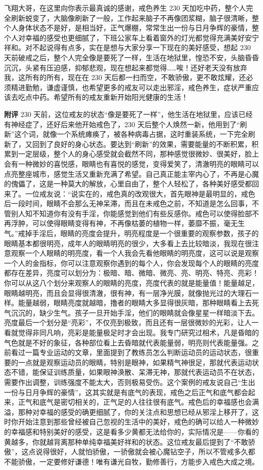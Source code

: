 \begin{case}
    飞翔大哥，在这里向你表示最真诚的感谢，戒色养生 230 天加吃中药，整个人完全刷新蜕变了，大脑像刷新了一般，工作起来脑子不再像团浆糊，脑子很清晰，整个人身体状态不是好，是相当好，正气爆棚，常常生出一份与日月争辉的豪情，整个人对幸福的感受也更细腻了，下班公家车上看着窗外的灯光都觉得充满美好安宁祥和。对不起说得有点多，实在是想与大家分享一下现在的美好感受，想起 230 天前破戒之后，整个人完全像是要死了一样，生活在地狱里，惶恐不安，头脑昏昏沉沉，头紧有压迫感，抑郁悲观，现在想起来都觉得……唉！还好老天没有放弃我，这所有的所有，现在在 230 天后都一扫而空，不敢骄傲，更不敢炫耀，还必须精进勤勉，谦虚谨慎，也希望更多的戒友可以走出邪淫，戒色养生，症状严重应该去吃点中药。希望所有的戒友重新开始阳光健康的生活！

    \textbf{附评} 230 天前，这位戒友的状态“像是要死了一样”，他生活在地狱里，应该已经有神经症了，还好后来他开始戒色了，230 天后整个人焕然一新，他用到了“刷新”这个词，就像一个系统瘫痪了，被各种病毒占据，这时重装系统，一下完全刷新了，又回到了良好的身心状态。要达到“刷新”的效果，需要能量的不断积累，积累到一定层级，整个人的身心感受就会截然不同，那种感觉很微妙、很美好，脸上会有一种微妙的喜悦感，眼睛也有喜悦的感觉，变得爱笑了，清澈明亮的眼睛可以点亮整座城市，感觉生活又重新充满了希望。自己真正能主宰内心了，不再是心魔的傀儡了，这是一种莫大的解放，心里自由了，整个人轻松了，各种美好感受都回来了。一位戒友说：“说实在的，戒色真的改观很大，首先眼神是最明显的，戒色后一段时间，眼睛不会那么无神呆滞，而且在未戒色之前，不知道是怎么回事，不管别人知不知道你有没有手淫，你能感觉到他们有些反感你。戒色可以使得脸部不再浮肿，可以使得眼睛变得有神，不再像枯萎的植物一样，萎靡不振，毫无生气。”戒掉手淫后，眼睛的亮度会提升，明亮程度是一个很重要的观察参数，孩子的眼睛基本都很明亮，成年人的眼睛明亮的很少，大多看上去比较暗淡，我现在很注意观察一个人眼睛的明亮度，看一个人我会先看他眼睛的明亮度，这可以说是观察一个人的金指标，你可以注意观察你遇到的每个人，你会发现每个人的眼睛的亮度都存在差异，亮度可以划分为：极暗、暗、微暗、微亮、亮、明亮、特亮、亮彩！你可以从这八个划分来观察人的眼睛的亮度，亮度代表的就是能量值！能量越足，眼睛越明亮，而且会显得很清澈，很有神，有一层净光膜，就像抛光过的大理石一样。能量越弱，眼睛亮度就越暗，撸者的眼睛大多显得很灰暗，那种眼睛看上去死气沉沉的，缺少生气。孩子一旦开始手淫，他们的眼睛就会像星星一样暗淡下去。亮度最后一个划分是“亮彩”，不仅亮到极致，而且还有一层很微妙的光彩，让人一看就觉得非同凡响，亮彩是能量极足时才会出现。我专门研究过相术，凡是昏暗的气色就是不好的象征，各种部位看上去昏暗就代表能量弱，明亮则代表能量强。之前看过一篇专业运动的文章，里面提到了教练员怎么判断运动员的运动状态，很重要的一点就是观察运动员的眼睛，特别是眼神，如果精气神很足，那就代表运动状态不错，能保证训练质量，如果眼神涣散、呆滞无神，那就代表运动员不在状态，需要作出调整，训练强度不能太大，否则极易受伤。这个案例的戒友说自己“生出一份与日月争辉的豪情”，这其实就是有底气的表现，戒色之后正气和底气都会起来，正气和底气是密切相关的，正气足的人往往很有底气。戒色后的幸福感也会满溢，那种对幸福的感受的确更细腻了，你的关注点和思想已经从邪淫上移开了，这时你开始注意到那些曾经被自己忽视的生活中的美好，戒色的确可以给人一种微妙的幸福感和特别美好的感受，这是看多少黄都无法给你的，实际情况是——你看的黄越多，你就越背离那种单纯幸福美好祥和的状态。这位戒友最后提到了“不敢骄傲”，这点说得很好，人就怕骄傲，一骄傲就会被心魔钻空子，所以不管戒多久都不能骄傲，一定要修好谦德！唯有谦光自牧，勤修善行，方能步入戒色大成之境。

\end{case}
